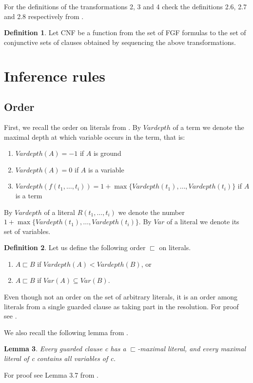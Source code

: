 \documentclass[english, shortabstract]{iithesis}
\theoremstyle{definition} \newtheorem{definition}{Definition}[chapter]
\theoremstyle{remark} \newtheorem{remark}[definition]{Observation}
\theoremstyle{plain} \newtheorem{theorem}[definition]{Theorem}
\theoremstyle{plain} \newtheorem{lemma}[definition]{Lemma}
\begin{document}
For the definitions of the transformations 2, 3 and 4 check the definitions 2.6, 2.7 and 2.8 respectively from \cite{nivelle}.

\begin{definition}
Let CNF be a function from the set of FGF formulas to the set of conjunctive sets of clauses obtained by sequencing the above transformations.
\end{definition}

\section{Inference rules}\label{section:inference}

\subsection{Order}

First, we recall the order on literals from \cite{nivelle}.
By $\mathit{Vardepth}$ of a term we denote the maximal depth at which variable occurs in the term, that is:
\begin{enumerate}
    \item $\mathit{Vardepth}(A)=-1$ if $A$ is ground
    \item $\mathit{Vardepth}(A)=0$ if $A$ is a variable
    \item $\mathit{Vardepth}(f(t_1,\dots, t_i))=1+\max\{\mathit{Vardepth}(t_1), \dots, \mathit{Vardepth}(t_i)\}$ if $A$ is a term
\end{enumerate}
By $\mathit{Vardepth}$ of a literal $R(t_1, \dots, t_i)$ we denote the number $1+\max\{\mathit{Vardepth}(t_1), \dots, \mathit{Vardepth}(t_i)\}$.
By $\mathit{Var}$ of a literal we denote its set of variables.
\begin{definition}\label{def:order}
Let us define the following order $\sqsubset$ on literals.
\begin{enumerate}
    \item $A \sqsubset B$ if $Vardepth(A) < Vardepth(B)$, or
    \item $A \sqsubset B$ if $\mathit{Var}(A) \subseteq Var(B)$.
\end{enumerate}
\end{definition}
Even though not an order on the set of arbitrary literals, it is an order among literals from a single guarded clause as taking part in the resolution.
For proof see \cite{nivelle}.

We also recall the following lemma from \cite{nivelle}.
\begin{lemma}\label{lem:guarded}
Every guarded clause c has a $\sqsubset$-maximal literal, and every maximal literal
of c contains all variables of c.
\end{lemma}
For proof see Lemma 3.7 from \cite{nivelle}.
\end{document}
